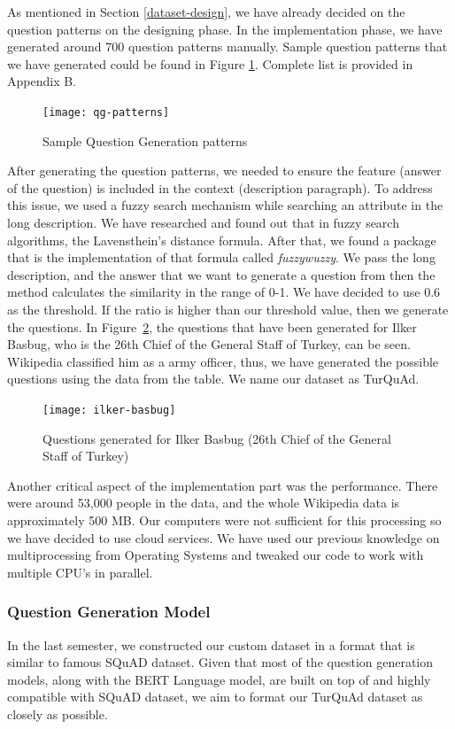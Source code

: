 \documentclass{mefsdp}
\begin{document}
	As mentioned in Section \ref{dataset-design}, we have already decided on the question patterns on the designing phase. In the implementation phase, we have generated around 700 question patterns manually. Sample question patterns that we have generated could be found in Figure \ref{qg-patterns}. Complete list is provided in Appendix B.
	\begin{figure}[h!]
		\centering
		\texttt{[image: qg-patterns]}
		\caption{Sample Question Generation patterns\label{qg-patterns}}
	\end{figure}
	After generating the question patterns, we needed to ensure the feature (answer of the question) is included in the context (description paragraph). To address this issue, we used a fuzzy search mechanism while searching an attribute in the long description. We have researched and found out that in fuzzy search algorithms, the Lavensthein's distance formula. After that, we found a package that is the implementation of that formula called \textit{fuzzywuzzy}. We pass the long description, and the answer that we want to generate a question from then the method calculates the similarity in the range of 0-1. We have decided to use 0.6 as the threshold. If the ratio is higher than our threshold value, then we generate the questions. In Figure \ref{ilker-basbug}, the questions that have been generated for Ilker Basbug, who is the 26th Chief of the General Staff of Turkey, can be seen. Wikipedia classified him as a army officer, thus, we have generated the possible questions using the data from the table. We name our dataset as TurQuAd.\\
	
	\begin{figure}[h!]
		\centering
		\texttt{[image: ilker-basbug]}
		\caption{Questions generated for Ilker Basbug (26th Chief of the General Staff of Turkey)\label{ilker-basbug}}
	\end{figure}
	
	
	Another critical aspect of the implementation part was the performance. There were around 53,000 people in the data, and the whole Wikipedia data is approximately 500 MB. Our computers were not sufficient for this processing so we have decided to use cloud services. We have used our previous knowledge on multiprocessing from Operating Systems and tweaked our code to work with multiple CPU's in parallel.
	
	\subsubsection{Question Generation Model}
	In the last semester, we constructed our custom dataset in a format that is similar to famous SQuAD \cite{rajpurkar2016squad} dataset. Given that most of the question generation models, along with the BERT Language model, are built on top of and highly compatible with SQuAD dataset, we aim to format our TurQuAd dataset as closely as possible. \newline \par 
	
\end{document}
